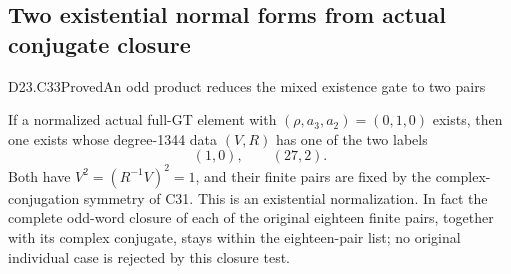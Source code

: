 \subsection{Two existential normal forms from actual conjugate closure}

\begin{statement}{D23.C33}{Proved}{An odd product reduces the mixed existence gate to two pairs}
\end{statement}
If a normalized actual full-GT element with
$(\rho,a_3,a_2)=(0,1,0)$ exists, then one exists whose
degree-1344 data $(V,R)$ has one of the two labels
\[
                              (1,0),\qquad(27,2).          \tag{D23.C33.1}
\]
Both have $V^2=(R^{-1}V)^2=1$, and their finite pairs
are fixed by the complex-conjugation symmetry of C31.
This is an existential normalization.  In fact the
complete odd-word closure of each of the original
eighteen finite pairs, together with its complex conjugate,
stays within the eighteen-pair list; no original individual
case is rejected by this closure test.

